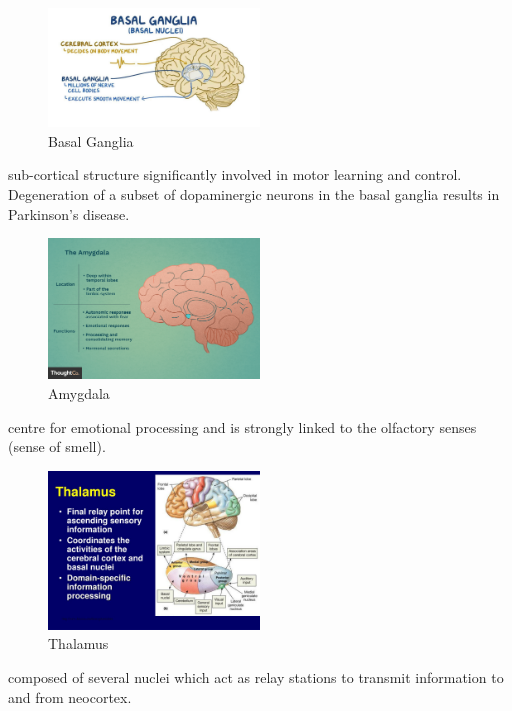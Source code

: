 \documentclass{article}
\begin{document}
\begin{figure}[h]
\centering
\includegraphics[width=0.5\textwidth]{assets/basalGanglia.png}
\caption{Basal Ganglia}
\end{figure}

\noindent sub-cortical structure significantly involved in motor learning and control. Degeneration of a subset of dopaminergic neurons in the basal ganglia results in Parkinson's disease.

\begin{figure}[h]
\centering
\includegraphics[width=0.5\textwidth]{assets/amygdala.png}
\caption{Amygdala}
\end{figure}

\noindent centre for emotional processing and is strongly linked to the olfactory senses (sense of smell).

\begin{figure}[h]
\centering
\includegraphics[width=0.5\textwidth]{assets/thalamus.png}
\caption{Thalamus}
\end{figure}

\noindent composed of several nuclei which act as relay stations to transmit information to and from neocortex.
\end{document}
